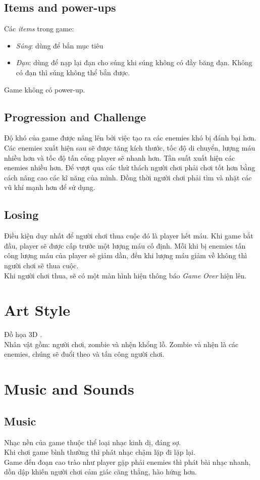 \documentclass[14pt,a4paper]{extreport}
\begin{document}
\section{Items and power-ups}
Các \textit{items} trong game: 
\begin{itemize}
	\item \textit{Súng}: dùng để bắn mục tiêu
	\item \textit{Đạn}: dùng để nạp lại đạn cho súng khi súng không có đầy băng đạn. Không có đạn thì súng không thể bắn được.

\end{itemize}

Game không có power-up.

\section{Progression and Challenge}
Độ khó của game được nâng lên bởi việc tạo ra các enemies khó bị đánh bại hơn. Các enemies xuất hiện sau sẽ được tăng kích thước, tốc độ di chuyển, lượng máu nhiều hơn và tốc độ tấn công player sẽ nhanh hơn. Tần suất xuất hiện các enemies nhiều hơn. Để vượt qua các thử thách người chơi phải chơi tốt hơn bằng cách nâng cao các kĩ năng của mình. Đồng thời người chơi phải tìm và nhặt các vũ khí mạnh hơn để sử dụng.


\section{Losing}
Điều kiện duy nhất để người chơi thua cuộc đó là player hết máu. Khi game bắt đầu, player sẽ được cấp trước một lượng máu cố định. Mỗi khi bị enemies tấn công lượng máu của player sẽ giảm dần, đến khi lượng máu giảm về không thì người chơi sẽ thua cuộc. \\
Khi người chơi thua, sẽ có một màn hình hiện thông báo \textit{Game Over} hiện lên.

\chapter{Art Style}
Đồ họa 3D .\\
Nhân vật gồm: người chơi, zombie và nhện khổng lồ.
Zombie và nhện là các enemies, chúng sẽ đuổi theo và tấn công người chơi.

\chapter{Music and Sounds}
\section{Music}
Nhạc nền của game thuộc thể loại nhạc kinh dị, đáng sợ. \\
Khi chơi game bình thường thì phát nhạc chậm lặp đi lặp lại. \\
Game đến đoạn cao trào như player gặp phải enemies thì phát bài nhạc nhanh, dồn dập khiến người chơi cảm giác căng thẳng, hào hứng hơn.
\end{document}
